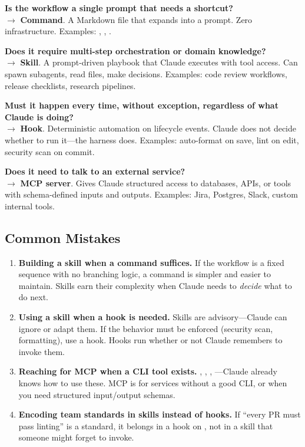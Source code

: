 \begin{decisionbox}
\textbf{Is the workflow a single prompt that needs a shortcut?}\\
$\rightarrow$ \textbf{Command}. A Markdown file that expands into a prompt.
Zero infrastructure. Examples: , , .

\textbf{Does it require multi-step orchestration or domain knowledge?}\\
$\rightarrow$ \textbf{Skill}. A prompt-driven playbook that Claude executes
with tool access. Can spawn subagents, read files, make decisions.
Examples: code review workflows, release checklists, research pipelines.

\textbf{Must it happen every time, without exception, regardless of what
Claude is doing?}\\
$\rightarrow$ \textbf{Hook}. Deterministic automation on lifecycle events.
Claude does not decide whether to run it---the harness does.
Examples: auto-format on save, lint on edit, security scan on commit.

\textbf{Does it need to talk to an external service?}\\
$\rightarrow$ \textbf{MCP server}. Gives Claude structured access to databases,
APIs, or tools with schema-defined inputs and outputs.
Examples: Jira, Postgres, Slack, custom internal tools.
\end{decisionbox}

\subsection*{Common Mistakes}

\begin{enumerate}
  \item \textbf{Building a skill when a command suffices.}
    If the workflow is a fixed sequence with no branching logic,
    a command is simpler and easier to maintain. Skills earn their
    complexity when Claude needs to \emph{decide} what to do next.

  \item \textbf{Using a skill when a hook is needed.}
    Skills are advisory---Claude can ignore or adapt them.
    If the behavior must be enforced (security scan, formatting),
    use a hook. Hooks run whether or not Claude remembers to invoke them.

  \item \textbf{Reaching for MCP when a CLI tool exists.}
    , , , ---Claude already
    knows how to use these. MCP is for services without a good CLI,
    or when you need structured input/output schemas.

  \item \textbf{Encoding team standards in skills instead of hooks.}
    If ``every PR must pass linting'' is a standard, it belongs in a
     hook on , not in a
    skill that someone might forget to invoke.
\end{enumerate}

